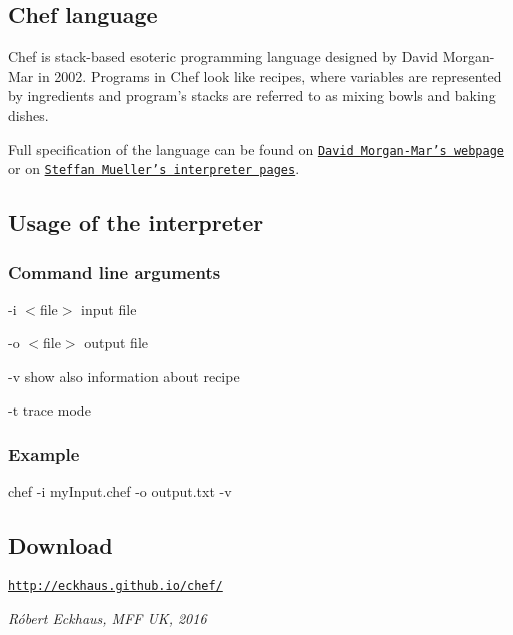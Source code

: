 \subsection*{Chef language}

Chef is stack-\/based esoteric programming language designed by David Morgan-\/\-Mar in 2002. Programs in Chef look like recipes, where variables are represented by ingredients and program's stacks are referred to as mixing bowls and baking dishes.

Full specification of the language can be found on \href{http://www.dangermouse.net/esoteric/chef.html}{\tt David Morgan-\/\-Mar's webpage} or on \href{http://search.cpan.org/~smueller/Acme-Chef/lib/Acme/Chef.pm}{\tt Steffan Mueller's interpreter pages}. \subsection*{Usage of the interpreter}

\subsubsection*{Command line arguments}

-\/i $<$file$>$ input file

-\/o $<$file$>$ output file

-\/v show also information about recipe

-\/t trace mode \subsubsection*{Example}

chef -\/i my\-Input.\-chef -\/o output.\-txt -\/v

\subsection*{Download}

\href{http://eckhaus.github.io/chef/}{\tt http\-://eckhaus.\-github.\-io/chef/}

{\itshape Róbert Eckhaus, M\-F\-F U\-K, 2016} 
